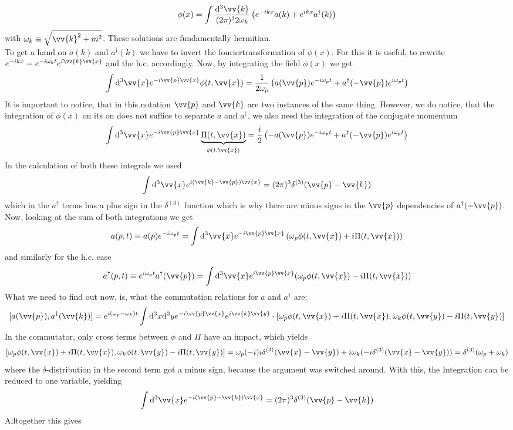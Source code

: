 \documentclass{include/thesisclass}
\newcommand{\cc}{\cdot}
\newcommand{\vx}{\vv{x}}
\newcommand{\vy}{\vv{y}}
\newcommand{\vp}{\vv{p}}
\newcommand{\dd}{{\rm d}}
\begin{document}
\[ \phi(x) = \int \frac{\dd ^3 \vv{k}}{(2\pi)^3 2 \omega_k} \left( e^{-ikx}a(k) + e^{ikx}a^\dagger(k)\right)\]
with $\omega_k \equiv \sqrt{ \vv{k}^2 + m^2}$. These solutions are fundamentally hermitian.\\
To get a hand on $a(k)$ and $a^\dagger(k)$ we have to invert the fouriertransformation of $\phi(x)$. For this it is useful, to rewrite $e^{-ikx} = e^{-i\omega_kt}e^{i \vv{k}\vx}$ and the h.c. accordingly. Now, by integrating the field $\phi(x)$ we get
\[ \int \dd^3 \vx e^{-i\vp\vx}\phi(t, \vx) = \frac{1}{2\omega_p}\left( a(\vp) e^{-i\omega_p t} + a^\dagger(-\vp)e^{i \omega_p t}\right)\]
It is important to notice, that in this notation $\vp$ and $\vv{k}$ are two instances of the same thing. However, we do notice, that the integration of $\phi(x)$ on its on does not suffice to separate $a$ and $a^\dagger$, we also need the integration of the conjugate momentum
\[ \int \dd^3 \vx e^{-i \vp \vx} \underbrace{\Pi(t, \vx)}_{\dot{\phi}(t,\vx)} = \frac{i}{2} \left( - a (\vp) e^{-i \omega_p t} + a^\dagger(- \vp) e^{i \omega_p t}\right)\]
In the calculation of both these integrals we used
\[ \int \dd ^3 \vx e^{i(\vv{k} - \vp)\vx} = (2\pi)^3 \delta^{(3)}(\vp - \vv{k})\]
which in the $a^\dagger$ terms has a plus sign in the $\delta^{(3)}$ function which is why there are minus signs in the $\vp$ dependencies of $a^\dagger(-\vp)$. Now, looking at the sum of both integrations we get
\[ a(p,t) \equiv a(p) e^{-i\omega_p t} = \int \dd^3 \vx e^{-i \vp \vx} \left( \omega_p \phi(t, \vx) + i \Pi(t, \vx)\right)\]
and similarly for the h.c. case
\[ a^\dagger(p,t) \equiv e^{i \omega_p t} a^\dagger(\vp) = \int \dd^3 \vx e^{i \vp \vx} ( \omega_p \phi(t, \vx) - i \Pi(t, \vx) )\]
What we need to find out now, is, what the commutation relations for $a$ and $a^\dagger$ are:
\[ [a(\vp), a^\dagger( \vv{k}) ] = e^{i(\omega_p - \omega _k) t} \int \dd^3 x \dd^3 y e^{-i \vp \vx} e^{ i \vv{k} \vy} \cc [ \omega_p \phi(t, \vx) + i \Pi(t, \vx), \omega_k\phi(t, \vy) - i \Pi(t, \vy)]\]
In the commutator, only cross terms between $\phi$ and $\Pi$ have an impact, which yields
\[ [ \omega_p \phi(t, \vx) + i \Pi(t, \vx), \omega_k\phi(t, \vy) - i \Pi(t, \vy)] = \omega_p(-i)i\delta^{(3)}(\vx - \vy) + i \omega_k ( -i \delta^{(3)}(\vx - \vy)) = \delta^{(3)} ( \omega_p + \omega_k)\]
where the $\delta$-distribution in the second term got a minus sign, because the argument was switched around. With this, the Integration can be reduced to one variable, yielding 
\[ \int \dd^3 \vx e^{-i ( \vp - \vv{k} ) \vx} = (2\pi)^3 \delta^{(3)}(\vp - \vv{k})\]
Alltogether this gives
\end{document}
